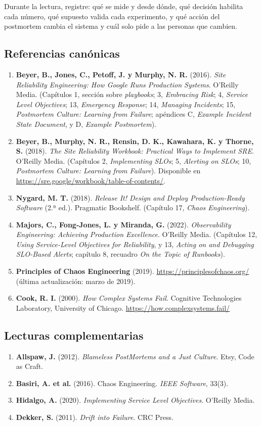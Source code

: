 \documentclass[variant=apuntes,cover=institutional,mode=screen]{ua-engineering-v6-article}
\begin{document}
Durante la lectura, registre: qué se mide y desde dónde, qué decisión habilita cada número, qué supuesto valida cada experimento, y qué acción del postmortem cambia el sistema y cuál solo pide a las personas que cambien.

\subsection*{Referencias canónicas}
\begin{enumerate}
\item \textbf{Beyer, B., Jones, C., Petoff, J. y Murphy, N. R.} (2016). \emph{Site Reliability Engineering: How Google Runs Production Systems}. O'Reilly Media. (Capítulos 1, sección sobre \emph{playbooks}; 3, \emph{Embracing Risk}; 4, \emph{Service Level Objectives}; 13, \emph{Emergency Response}; 14, \emph{Managing Incidents}; 15, \emph{Postmortem Culture: Learning from Failure}; apéndices C, \emph{Example Incident State Document}, y D, \emph{Example Postmortem}).
\item \textbf{Beyer, B., Murphy, N. R., Rensin, D. K., Kawahara, K. y Thorne, S.} (2018). \emph{The Site Reliability Workbook: Practical Ways to Implement SRE}. O'Reilly Media. (Capítulos 2, \emph{Implementing SLOs}; 5, \emph{Alerting on SLOs}; 10, \emph{Postmortem Culture: Learning from Failure}). Disponible en \url{https://sre.google/workbook/table-of-contents/}.
\item \textbf{Nygard, M. T.} (2018). \emph{Release It! Design and Deploy Production-Ready Software} (2.ª ed.). Pragmatic Bookshelf. (Capítulo 17, \emph{Chaos Engineering}).
\item \textbf{Majors, C., Fong-Jones, L. y Miranda, G.} (2022). \emph{Observability Engineering: Achieving Production Excellence}. O'Reilly Media. (Capítulos 12, \emph{Using Service-Level Objectives for Reliability}, y 13, \emph{Acting on and Debugging SLO-Based Alerts}; capítulo 8, recuadro \emph{On the Topic of Runbooks}).
\item \textbf{Principles of Chaos Engineering} (2019). \url{https://principlesofchaos.org/} (última actualización: marzo de 2019).
\item \textbf{Cook, R. I.} (2000). \emph{How Complex Systems Fail}. Cognitive Technologies Laboratory, University of Chicago. \url{https://how.complexsystems.fail/}
\end{enumerate}

\subsection*{Lecturas complementarias}
\begin{enumerate}
\item \textbf{Allspaw, J.} (2012). \emph{Blameless PostMortems and a Just Culture}. Etsy, Code as Craft.
\item \textbf{Basiri, A. et al.} (2016). Chaos Engineering. \emph{IEEE Software}, 33(3).
\item \textbf{Hidalgo, A.} (2020). \emph{Implementing Service Level Objectives}. O'Reilly Media.
\item \textbf{Dekker, S.} (2011). \emph{Drift into Failure}. CRC Press.
\end{enumerate}
\end{document}
